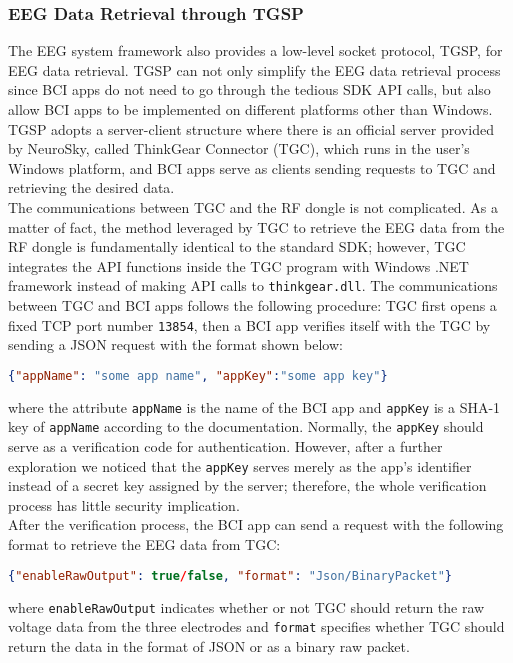 \subsubsection{EEG Data Retrieval through TGSP}
The EEG system framework also provides a low-level socket protocol, TGSP, for EEG data retrieval. TGSP can not only simplify the EEG data retrieval process since BCI apps do not need to go through the tedious SDK API calls, but also allow BCI apps to be implemented on different platforms other than Windows. TGSP adopts a server-client structure where there is an official server provided by NeuroSky, called ThinkGear Connector (TGC), which runs in the user's Windows platform, and BCI apps serve as clients sending requests to TGC and retrieving the desired data. \\
%
\indent The communications between TGC and the RF dongle is not complicated. As a matter of fact, the method leveraged by TGC to retrieve the EEG data from the RF dongle is fundamentally identical to the standard SDK; however, TGC integrates the API functions inside the TGC program with Windows .NET framework instead of making API calls to \texttt{thinkgear.dll}. The communications between TGC and BCI apps follows the following procedure: TGC first opens a fixed TCP port number \texttt{13854}, then a BCI app verifies itself with the TGC by sending a JSON request with the format shown below:
\begin{lstlisting}[language=json]
{"appName": "some app name", "appKey":"some app key"}
\end{lstlisting}
where the attribute \texttt{appName} is the name of the BCI app and \texttt{appKey} is a SHA-1 key of \texttt{appName} according to the documentation. Normally, the \texttt{appKey} should serve as a verification code for authentication. However, after a further exploration we noticed that the \texttt{appKey} serves merely as the app's identifier instead of a secret key assigned by the server; therefore, the whole verification process has little security implication. \\
%
\indent After the verification process, the BCI app can send a request with the following format to retrieve the EEG data from TGC:
\begin{lstlisting}[language=json]
{"enableRawOutput": true/false, "format": "Json/BinaryPacket"}
\end{lstlisting}
where \texttt{enableRawOutput} indicates whether or not TGC should return the raw voltage data from the three electrodes and \texttt{format} specifies whether TGC should return the data in the format of JSON or as a binary raw packet. \\
